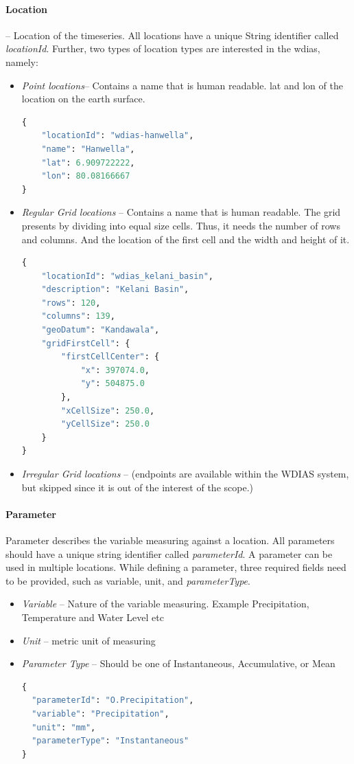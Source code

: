 \paragraph{Location}-- Location of the timeseries. All locations have a unique String identifier called \emph{locationId}. Further, two types of location types are interested in the \acrshort{wdias}, namely:
\begin{itemize}
  \item \emph{Point locations}-- Contains a name that is human readable. lat and lon of the location on the earth surface.
\begin{lstlisting}[language=Python]
{
    "locationId": "wdias-hanwella",
    "name": "Hanwella",
    "lat": 6.909722222,
    "lon": 80.08166667
}
\end{lstlisting}
  \item \emph{Regular Grid locations} -- Contains a name that is human readable. The grid presents by dividing into equal size cells. Thus, it needs the number of rows and columns. 
  And the location of the first cell and the width and height of it.
\begin{lstlisting}[language=Python]
{
    "locationId": "wdias_kelani_basin",
    "description": "Kelani Basin",
    "rows": 120,
    "columns": 139,
    "geoDatum": "Kandawala",
    "gridFirstCell": {
        "firstCellCenter": {
            "x": 397074.0,
            "y": 504875.0
        },
        "xCellSize": 250.0,
        "yCellSize": 250.0
    }
}
\end{lstlisting}
  \item \emph{Irregular Grid locations} -- (endpoints are available within the WDIAS system, but skipped since it is out of the interest of the scope.)
\end{itemize}

\paragraph{Parameter}
Parameter describes the variable measuring against a location. All parameters should have a unique string identifier called \emph{parameterId}. A parameter can be used in multiple locations. While defining a parameter, three required fields need to be provided, such as variable, unit, and \emph{parameterType}.

\begin{itemize}  
  \item \emph{Variable} -- Nature of the variable measuring. Example Precipitation, Temperature and Water Level etc
  \item \emph{Unit} -- metric unit of measuring
  \item \emph{Parameter Type} -- Should be one of Instantaneous, Accumulative, or Mean
\begin{lstlisting}[language=Python]
{
  "parameterId": "O.Precipitation",
  "variable": "Precipitation",
  "unit": "mm",
  "parameterType": "Instantaneous"
}
\end{lstlisting}
\end{itemize}

